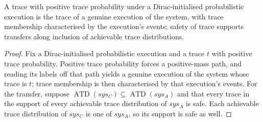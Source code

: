 \begin{theorem}
  \label{thm:trace-support}
  \leanok
  A trace with positive trace probability under a Dirac-initialised
  probabilistic execution is the trace of a genuine execution of the system,
  with trace membership characterised by the execution's events; safety of
  trace supports transfers along inclusion of achievable trace distributions.
\end{theorem}

\begin{proof}\leanok
  Fix a Dirac-initialised probabilistic execution and a trace $t$ with positive trace probability.
  Positive trace probability forces a positive-mass path, and reading its labels off that path yields a genuine execution of the system whose trace is $t$; trace membership is then characterised by that execution's events.
  For the transfer, suppose $\operatorname{ATD}(sys_C) \subseteq \operatorname{ATD}(sys_A)$ and that every trace in the support of every achievable trace distribution of $sys_A$ is safe.
  Each achievable trace distribution of $sys_C$ is one of $sys_A$, so its support is safe as well.
\end{proof}
